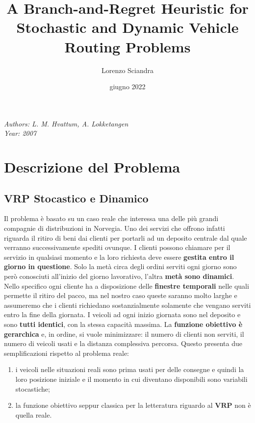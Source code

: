 \documentclass[
]{article}
\title{A Branch-and-Regret Heuristic for Stochastic and Dynamic Vehicle
Routing Problems}
\author{Lorenzo Sciandra}
\date{giugno 2022}
\providecommand{\tightlist}{%
  \setlength{\itemsep}{0pt}\setlength{\parskip}{0pt}}
\begin{document}
\maketitle

\emph{Authors: L. M. Hvattum, A. Lokketangen}\\
\emph{Year: 2007}

\hypertarget{descrizione-del-problema}{%
\section{Descrizione del Problema}\label{descrizione-del-problema}}

\hypertarget{mathbfvrp-stocastico-e-dinamico}{%
\subsection{\texorpdfstring{VRP Stocastico e
Dinamico}{VRP Stocastico e Dinamico}}\label{mathbfvrp-stocastico-e-dinamico}}

Il problema è basato su un caso reale che interessa una delle più grandi
compagnie di distribuzioni in Norvegia. Uno dei servizi che offrono
infatti riguarda il ritiro di beni dai clienti per portarli ad un
deposito centrale dal quale verranno successivamente spediti ovunque. I
clienti possono chiamare per il servizio in qualsiasi momento e la loro
richiesta deve essere \textbf{gestita entro il giorno in questione}.
Solo la metà circa degli ordini serviti ogni giorno sono però
conosciuti all'inizio del giorno lavorativo, l'altra \textbf{metà sono
dinamici}. Nello specifico ogni cliente ha a disposizione delle
\textbf{finestre temporali} nelle quali permette il ritiro del pacco, ma
nel nostro caso queste saranno molto larghe e assumeremo che i clienti
richiedano sostanzialmente solamente che vengano serviti entro la fine
della giornata. I veicoli ad ogni inizio giornata sono nel deposito e
sono \textbf{tutti identici}, con la stessa capacità massima. La
\textbf{funzione obiettivo è gerarchica} e, in ordine, si vuole minimizzare:
il numero di clienti non serviti, il numero di veicoli usati e la
distanza complessiva percorsa. Questo presenta due semplificazioni
rispetto al problema reale:

\begin{enumerate}
\tightlist
\item
  i veicoli nelle situazioni reali sono prima usati per delle consegne e
  quindi la loro posizione iniziale e il momento in cui diventano
  disponibili sono variabili stocastiche;
\item
  la funzione obiettivo seppur classica per la letteratura riguardo al
  {\(\mathbf{VRP}\)} non è quella reale.
\end{enumerate}
\end{document}
